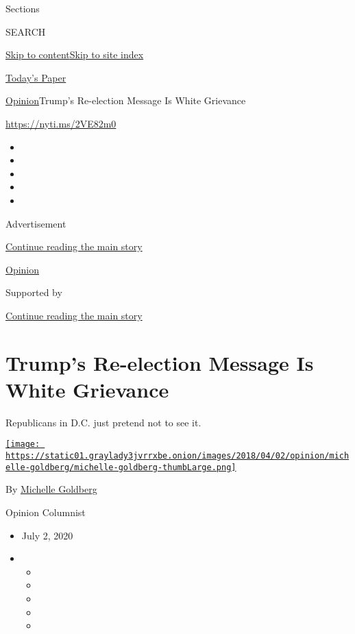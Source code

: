 Sections

SEARCH

\protect\hyperlink{site-content}{Skip to
content}\protect\hyperlink{site-index}{Skip to site index}

\href{https://myaccount.nytimes3xbfgragh.onion/auth/login?response_type=cookie\&client_id=vi}{}

\href{https://www.nytimes3xbfgragh.onion/section/todayspaper}{Today's
Paper}

\href{/section/opinion}{Opinion}\textbar{}Trump's Re-election Message Is
White Grievance

\url{https://nyti.ms/2VE82m0}

\begin{itemize}
\item
\item
\item
\item
\item
\end{itemize}

Advertisement

\protect\hyperlink{after-top}{Continue reading the main story}

\href{/section/opinion}{Opinion}

Supported by

\protect\hyperlink{after-sponsor}{Continue reading the main story}

\hypertarget{trumps-re-election-message-is-white-grievance}{%
\section{Trump's Re-election Message Is White
Grievance}\label{trumps-re-election-message-is-white-grievance}}

Republicans in D.C. just pretend not to see it.

\href{https://www.nytimes3xbfgragh.onion/by/michelle-goldberg}{\texttt{[image: https://static01.graylady3jvrrxbe.onion/images/2018/04/02/opinion/michelle-goldberg/michelle-goldberg-thumbLarge.png]}}

By
\href{https://www.nytimes3xbfgragh.onion/by/michelle-goldberg}{Michelle
Goldberg}

Opinion Columnist

\begin{itemize}
\item
  July 2, 2020
\item
  \begin{itemize}
  \item
  \item
  \item
  \item
  \item
  \end{itemize}
\end{itemize}

